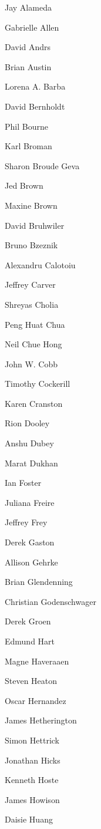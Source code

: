 \documentclass[11pt, oneside]{amsart}
\begin{document}
\begin{multicols}{3}
\setlength{\parindent}{0pt}

Jay Alameda

Gabrielle Allen

David Andrs

Brian Austin

Lorena A. Barba

David Bernholdt

Phil Bourne

Karl Broman

Sharon Broude Geva

Jed Brown

Maxine Brown

David Bruhwiler

Bruno Bzeznik

Alexandru Calotoiu

Jeffrey Carver

Shreyas Cholia

Peng Huat Chua

Neil Chue Hong %

John W. Cobb

Timothy Cockerill

Karen Cranston

Rion Dooley

Anshu Dubey

Marat Dukhan

Ian Foster

Juliana Freire

Jeffrey Frey

Derek Gaston

Allison Gehrke

Brian Glendenning

Christian Godenschwager

Derek Groen

Edmund Hart

Magne Haveraaen

Steven Heaton

Oscar Hernandez

James Hetherington

Simon Hettrick

Jonathan Hicks

Kenneth Hoste

James Howison

Daisie Huang


\end{multicols}
\end{document}
